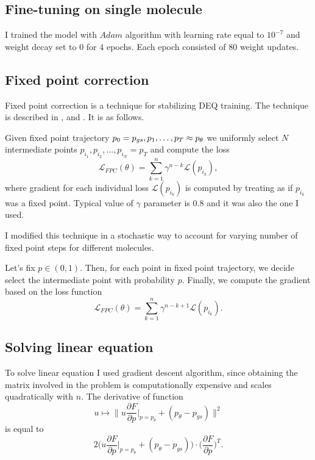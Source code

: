 \documentclass[a4paper,10.5pt]{report}
\begin{document}
\subsection{Fine-tuning on single molecule}
I trained the model with $Adam$ algorithm with learning rate equal to $10^{-7}$ and weight decay set to $0$ for $4$ epochs. Each epoch consisted of $80$ weight updates.


\subsection{Fixed point correction}\label{sec:fpc}
Fixed point correction is a technique for stabilizing DEQ training. The technique is described in \cite{opticalflow}, \cite{geng2023torchdeq}
and \cite{burger2025dequify}. It is as follows.

Given fixed point trajectory $p_0= p_{gs}, p_1,\ldots, p_T\approx  p_\theta $ we uniformly select $N$ intermediate points $p_{i_1}, p_{i_2}, \ldots , p_{i_N}=p_T$ and compute the loss
\begin{equation}
 \mathcal{L}_{FPC}(\theta) = \sum_{k=1}^{n}\gamma^{n-k}\mathcal{L}(p_{i_k}),
\end{equation}
where gradient for each individual loss $\mathcal{L}(p_{i_k})$ is computed by treating as if $p_{i_k}$ was a fixed point. Typical value of $\gamma$ parameter is $0.8$ and it was also the one I used.
\par
I modified this technique in a stochastic way to account for varying number of fixed point steps for different molecules.

Let's fix $p\in (0,1)$. Then, for each point in fixed point trajectory, we decide select the intermediate point with probability $p$.
Finally, we compute the gradient based on the loss function
\begin{equation}
 \mathcal{L}_{FPC}(\theta) = \sum_{k=1}^{n}\gamma^{n-k+1}\mathcal{L}(p_{i_k}).
\end{equation}
\subsection{Solving linear equation}
To solve linear equation I used gradient descent algorithm, since obtaining the matrix involved in the problem is computationally expensive and scales quadratically with $n$.
The derivative of function
\begin{equation*}
 u\mapsto \bigg\|u \frac{\partial F}{\partial p}\bigg|_{p=p_\theta} + (p_\theta-p_{gs})\bigg\|^2
 \end{equation*}
 is equal to
 \begin{equation*}
  2 \bigg( u \frac{\partial F}{\partial p}\bigg|_{p=p_\theta} + (p_\theta-p_{gs})  \bigg) \cdot \bigg(\frac{\partial F}{\partial p}\bigg)^T.
\end{equation*}
\end{document}

